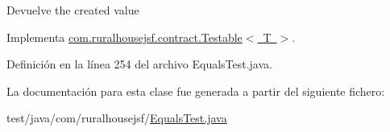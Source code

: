 \begin{DoxyReturn}{Devuelve}
the created value 
\end{DoxyReturn}


Implementa \mbox{\hyperlink{interfacecom_1_1ruralhousejsf_1_1contract_1_1_testable_ae4546a381488faaba1ef7c0f8688de9c}{com.\+ruralhousejsf.\+contract.\+Testable$<$ T $>$}}.



Definición en la línea 254 del archivo Equals\+Test.\+java.



La documentación para esta clase fue generada a partir del siguiente fichero\+:\begin{DoxyCompactItemize}
\item 
test/java/com/ruralhousejsf/\mbox{\hyperlink{_equals_test_8java}{Equals\+Test.\+java}}\end{DoxyCompactItemize}
